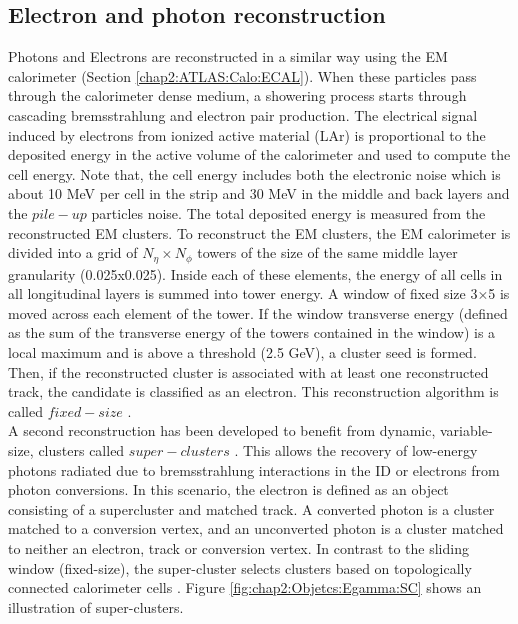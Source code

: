 \subsection{Electron and photon reconstruction}
\label{chap2:Objects:Egamma}
Photons and Electrons are reconstructed in a similar way using the EM calorimeter (Section \ref{chap2:ATLAS:Calo:ECAL}). When these particles pass through the calorimeter dense medium, a showering process starts through cascading bremsstrahlung and electron pair production. The electrical signal induced by electrons from ionized active material (LAr) is proportional to the deposited energy in the active volume of the calorimeter and used to compute the cell energy. Note that, the cell energy includes both the electronic noise which is about 10 MeV per cell in the strip and 30 MeV in the middle and back layers and the $pile-up$ particles noise. The total deposited energy is measured from the reconstructed EM clusters. To reconstruct the EM clusters, the EM calorimeter is divided into a grid of $N_\eta\times N_\phi$ towers of the size of the same middle layer granularity (0.025x0.025). Inside each of these elements, the energy of all cells in all longitudinal layers is summed into tower energy. A window of fixed size 3×5 is moved across each element of the tower. If the window transverse energy \eT (defined as the sum of the transverse energy of the towers contained in the window) is a local maximum and is above a threshold (2.5 GeV), a cluster seed is formed. Then, if the reconstructed cluster is associated with at least one reconstructed track, the candidate is classified as an electron. This reconstruction algorithm is called $fixed-size$ \cite{Fixed_size_cluster}. \\
A second reconstruction has been developed to benefit from dynamic, variable-size, clusters called $super-clusters$ \cite{Egamma_Perf_run2}. This allows the recovery of low-energy photons radiated due to bremsstrahlung interactions in the ID or electrons from photon conversions. In this scenario, the electron is defined as an object consisting of a supercluster and matched track. A converted photon is a cluster matched to a conversion vertex, and an unconverted photon is a cluster matched to neither an electron, track or conversion vertex. In contrast to the sliding window (fixed-size), the super-cluster selects clusters based on topologically connected calorimeter cells \cite{Topo_cluster}. Figure \ref{fig:chap2:Objetcs:Egamma:SC} shows an illustration of super-clusters.  
